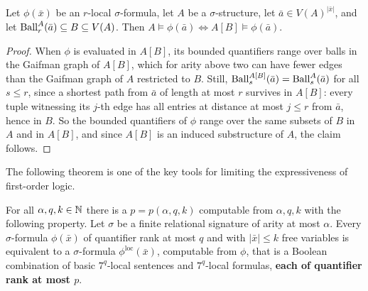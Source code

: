 \begin{lemma}\label{lem:local-substructure}
Let $\phi(\bar x)$ be an $r$-local $\sigma$-formula, let $A$ be a $\sigma$-structure, let $\bar a \in V(A)^{|\bar x|}$, and let $\operatorname{Ball}_r^A(\bar a)\subseteq B\subseteq V(A)$.
Then $A \models \phi(\bar a) \Leftrightarrow A[B] \models \phi(\bar a)$.
\end{lemma}
\begin{proof}
When $\phi$ is evaluated in $A[B]$, its bounded quantifiers range over balls in the Gaifman graph of $A[B]$, which for arity above two can have fewer edges than the Gaifman graph of $A$ restricted to $B$.
Still, $\operatorname{Ball}_s^{A[B]}(\bar a)=\operatorname{Ball}_s^A(\bar a)$ for all $s\le r$, since a shortest path from $\bar a$ of length at most $r$ survives in $A[B]$:
every tuple witnessing its $j$-th edge has all entries at distance at most $j\le r$ from $\bar a$, hence in $B$.
So the bounded quantifiers of $\phi$ range over the same subsets of $B$ in $A$ and in $A[B]$, and since $A[B]$ is an induced substructure of $A$, the claim follows.
\end{proof}

The following theorem is one of the key tools for limiting the expressiveness of first-order logic.

\newcommand{\loc}{\mathrm{loc}}
\begin{theorem}
    \label{fact:gaifman}
    For all $\alpha,q,k \in \mathbb N$ there is a $p = p(\alpha,q,k)$ computable from $\alpha,q,k$  with the following property.
    Let $\sigma$ be a finite relational signature of arity at most $\alpha$.
    Every $\sigma$-formula $\phi(\bar x)$ of quantifier rank at most $q$ and with $|\bar x| \leq k$ free variables is equivalent to a $\sigma$-formula $\phi^\loc(\bar x)$, computable from $\phi$, that is a Boolean combination of basic $7^q$-local sentences and $7^q$-local formulas, \textbf{\textup{each of quantifier rank at most $\textit{p}$}}.
\end{theorem}

